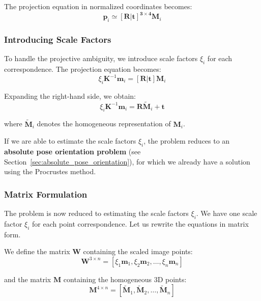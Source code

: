 \documentclass[11pt,a4paper]{article}
\theoremstyle{definition}
\theoremstyle{plain}
\theoremstyle{remark}
\begin{document}
The projection equation in normalized coordinates becomes:
\begin{equation} \nonumber
\mathbf{p}_i \simeq \mathbf{[R|t]^{3 \times 4}} \mathbf{M}_i
\end{equation}

\subsubsection{Introducing Scale Factors}

To handle the projective ambiguity, we introduce scale factors $\xi_i$ for each correspondence. The projection equation becomes:
\begin{equation} \nonumber
\xi_i \mathbf{K}^{-1} \mathbf{m}_i = \mathbf{[R|t]} \mathbf{M}_i
\end{equation}

Expanding the right-hand side, we obtain:
\begin{equation} \nonumber
\xi_i \mathbf{K}^{-1} \mathbf{m}_i = \mathbf{R} \tilde{\mathbf{M}}_i + \mathbf{t}
\end{equation}

where $\tilde{\mathbf{M}}_i$ denotes the homogeneous representation of $\mathbf{M}_i$.

\begin{tcolorbox}[colback=purple!5!white,colframe=purple!75!black,title=\textbf{Key Insight}]
If we are able to estimate the scale factors $\xi_i$, the problem reduces to an \textbf{absolute pose orientation problem} (see Section~\ref{sec:absolute_pose_orientation}), for which we already have a solution using the Procrustes method.
\end{tcolorbox}

\subsubsection{Matrix Formulation}

The problem is now reduced to estimating the scale factors $\xi_i$. We have one scale factor $\xi_i$ for each point correspondence. Let us rewrite the equations in matrix form.

We define the matrix $\mathbf{W}$ containing the scaled image points:
\begin{equation} \nonumber
\mathbf{W}^{3 \times n} = [\xi_1 \mathbf{m}_1, \xi_2 \mathbf{m}_2, \ldots, \xi_n \mathbf{m}_n]
\end{equation}

and the matrix $\mathbf{M}$ containing the homogeneous 3D points:
\begin{equation} \nonumber
\mathbf{M}^{4 \times n} = [\tilde{\mathbf{M}}_1, \tilde{\mathbf{M}}_2, \ldots, \tilde{\mathbf{M}}_n]
\end{equation}
\end{document}
